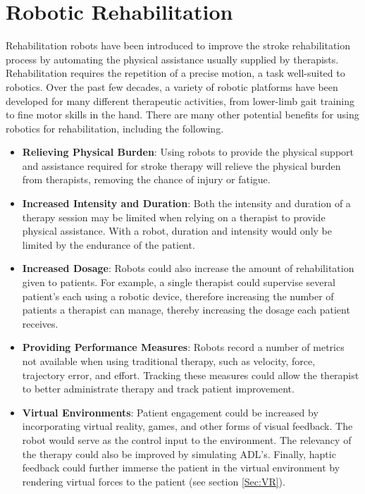 \documentclass[12pt]{report}
\begin{document}


\section{Robotic Rehabilitation}

	Rehabilitation robots have been introduced to improve the stroke rehabilitation process by automating the physical assistance usually supplied by therapists. Rehabilitation requires the repetition of a precise motion, a task well-suited to robotics. Over the past few decades, a variety of robotic platforms have been developed for many different therapeutic activities, from lower-limb gait training to fine motor skills in the hand. There are many other potential benefits for using robotics for rehabilitation, including the following.
\begin{itemize}
	\item \textbf{Relieving Physical Burden}: Using robots to provide the physical support and assistance required for stroke therapy will relieve the physical burden from therapists, removing the chance of injury or fatigue.
	\item \textbf{Increased Intensity and Duration}: Both the intensity and duration of a therapy session may be limited when relying on a therapist to provide physical assistance. With a robot, duration and intensity would only be limited by the endurance of the patient. 
	\item \textbf{Increased Dosage}: Robots could also increase the amount of rehabilitation given to patients. For example, a single therapist could supervise several patient's each using a robotic device, therefore increasing the number of patients a therapist can manage, thereby increasing the dosage each patient receives.
	\item \textbf{Providing Performance Measures}: Robots record a number of metrics not available when using traditional therapy, such as velocity, force, trajectory error, and effort. Tracking these measures could allow the therapist to better administrate therapy and track patient improvement. 
	\item \textbf{Virtual Environments}: Patient engagement could be increased by incorporating virtual reality, games, and other forms of visual feedback. The robot would serve as the control input to the environment. The relevancy of the therapy could also be improved by simulating ADL's. Finally, haptic feedback could further immerse the patient in the virtual environment by rendering virtual forces to the patient (see section \ref{Sec:VR}).
\end{itemize}
	
\end{document}
